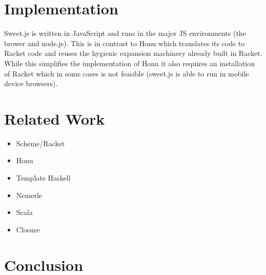 \documentclass[preprint,10pt]{sigplanconf}
\begin{document}
\section{Implementation}
\label{sec-6}
Sweet.js is written in JavaScript and runs in the major JS
environments (\ie the brower and node.js). This is in contrast to Honu
which translates its code to Racket code and reuses the hygienic
expansion machinery already built in Racket. While this simplifies
the implementation of Honu it also requires an installation of Racket
which in some cases is not feasible (\eg sweet.js is able to run in
mobile device browsers).
\section{Related Work}
\label{sec-7}

\begin{itemize}
\item Scheme/Racket
\item Honu
\item Template Haskell
\item Nemerle
\item Scala
\item Closure
\end{itemize}
\section{Conclusion}
\label{sec-8}
\end{document}
